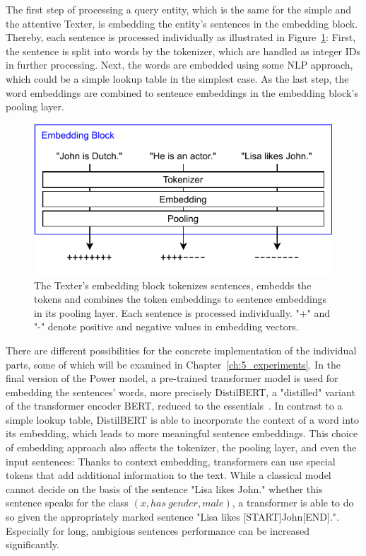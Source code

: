 The first step of processing a query entity, which is the same for the simple and the attentive Texter, is embedding the entity's sentences in the embedding block. Thereby, each sentence is processed individually as illustrated in Figure~\ref{fig:4_approach/1_texter/1_text_embedding/embedding_block}: First, the sentence is split into words by the tokenizer, which are handled as integer IDs in further processing. Next, the words are embedded using some NLP approach, which could be a simple lookup table in the simplest case. As the last step, the word embeddings are combined to sentence embeddings in the embedding block's pooling layer.

\begin{figure}[t]
    \centering
    \includegraphics{4_approach/1_texter/1_text_embedding/embedding_block}
    \caption{The Texter's embedding block tokenizes sentences, embedds the tokens and combines the token embeddings to sentence embeddings in its pooling layer. Each sentence is processed individually. "+" and "-" denote positive and negative values in embedding vectors.}
    \label{fig:4_approach/1_texter/1_text_embedding/embedding_block}
\end{figure}

There are different possibilities for the concrete implementation of the individual parts, some of which will be examined in Chapter~\ref{ch:5_experiments}. In the final version of the Power model, a pre-trained transformer model is used for embedding the sentences' words, more precisely DistilBERT, a "distilled" variant of the transformer encoder BERT, reduced to the essentials~\cite{Sanh2019DistilBERTAD}. In contrast to a simple lookup table, DistilBERT is able to incorporate the context of a word into its embedding, which leads to more meaningful sentence embeddings. This choice of embedding approach also affects the tokenizer, the pooling layer, and even the input sentences: Thanks to context embedding, transformers can use special tokens that add additional information to the text. While a classical model cannot decide on the basis of the sentence "Lisa likes John." whether this sentence speaks for the class $(x, has~gender, male)$, a transformer is able to do so given the appropriately marked sentence "Lisa likes [START]John[END].". Especially for long, ambigious sentences performance can be increased significantly.

